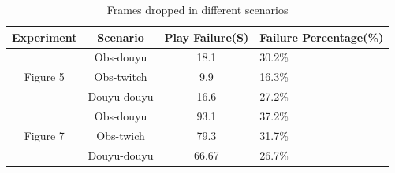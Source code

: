 \begin{table}[tb]
\centering
\caption{Frames dropped in different scenarios}
\label{tbl:drop}
{\setlength{\tabcolsep}{1pt}
\begin{tabular}{|c|c|c|l|}
\hline
\textbf{Experiment} & \textbf{Scenario} & \textbf{Play Failure(S)} & \textbf{ Failure Percentage(\%)}   \\ \hline
\multirow{3}{*}{Figure 5}&  Obs-douyu               & 18.1         & 30.2\%                           \\ \cline{2-4}
& Obs-twitch              & 9.9        & 16.3\%    \\ \cline{2-4}
& Douyu-douyu            & 16.6      & 27.2\% \\ \hline
\multirow{4}{*}{Figure 7} & Obs-douyu            & 93.1      & 37.2\%     \\ \cline{2-4}
& Obs-twich             & 79.3      & 31.7\%  \\ \cline{2-4}
& Douyu-douyu             & 66.67         & 26.7\%  \\ \hline
\end{tabular}}
\end{table} 